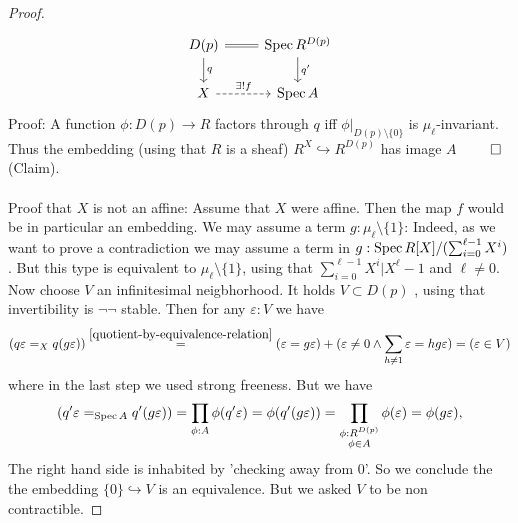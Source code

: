 \begin{proof}
	\[\begin{tikzcd}
		{D(p)} & {\Spec R^{D(p)}} \\
		X & {\Spec A}
		\arrow[Rightarrow, no head, from=1-1, to=1-2]
		\arrow["q", from=1-1, to=2-1]
		\arrow["q'",from=1-2, to=2-2]
		\arrow["{\exists! f}", dashed, from=2-1, to=2-2]
	\end{tikzcd}\]
	Proof: A function $\phi : D(p) \to R$ factors through $q$ iff $\phi|_{D(p) \setminus\{0\}}$ is $\mu_{\ell}$-invariant. Thus the embedding (using that $R$ is a sheaf) $R^X \hookrightarrow R^{D(p)}$ has image $A$ $\qed$(Claim). 	\\ \\ %
	Proof that $X$ is not an affine:	Assume that $X$ were affine. Then the map $f$ would be in particular an embedding. 
	We may assume a term $g : \mu_\ell \setminus \{1\}$: Indeed, as we want to prove a contradiction we may assume a term in $g : \operatorname{Spec} R[X] / (\sum_{i=0}^{\ell-1} X^i)$. But this type is equivalent to $\mu_\ell \setminus \{1\}$, using that $\sum_{i=0}^{\ell-1} X^i | X^\ell -1 $ and $\ell \neq 0$. \\
	Now choose $V$ an infinitesimal neigbhorhood. It holds $ V \subset D(p)$ , using that invertibility is $\lnot \lnot$ stable.
	Then for any $\varepsilon : V$ we have
	\begin{align*}
		(q\varepsilon =_X q (g \varepsilon)) \overset{\ref{quotient-by-equivalence-relation}}{=} (\varepsilon = g\varepsilon) + (\varepsilon \neq 0 \land \sum_{h \neq 1} \varepsilon = h g \varepsilon) =(\varepsilon \in V)
	\end{align*}
	where in the last step we used strong freeness.
	But we have 
	\[(q' \varepsilon =_{\operatorname{Spec} A} q' (g \varepsilon)) = \prod_{\phi : A} \phi(q' \varepsilon) = \phi(q' (g \varepsilon)) = \prod_{\substack{\phi : R^{D(p)} \\ \phi \in A}} \phi (\varepsilon) = \phi(g \varepsilon),\] 
	The right hand side is inhabited by 'checking away from 0'. 	So we conclude the the embedding $\{0\} \hookrightarrow V$ is an equivalence.  But we asked $V$ to be non contractible.%

\end{proof}
